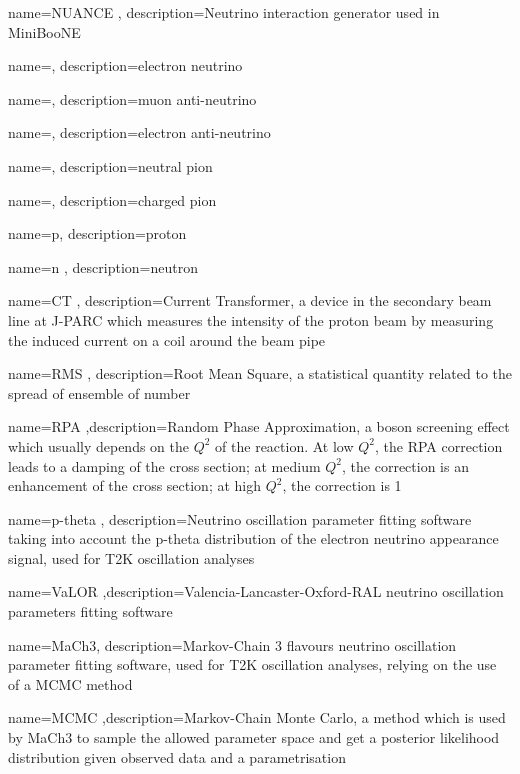  {name=NUANCE , description={Neutrino
interaction generator used in MiniBooNE}}

 {name=\nue , description={electron neutrino}}

 {name=\anumu , description={muon
anti-neutrino}}

 {name=\anue , description={electron
anti-neutrino}}

 {name=\piz , description={neutral pion}}

 {name=\pipm , description={charged pion}}

 {name=p, description={proton}}

 {name=n , description={neutron}}

 {name=CT , description={Current Transformer, a
device in the secondary beam line at J-PARC which measures the
intensity of the proton beam by measuring the induced current on a
coil around the beam pipe}}

 {name=RMS , description={Root Mean Square, a
statistical quantity related to the spread of ensemble of number}}

 {name=RPA ,description={Random Phase
Approximation, a boson screening effect which usually depends on the
$Q^2$ of the reaction. At low $Q^2$, the RPA correction leads to a
damping of the cross section; at medium $Q^2$, the correction is an
enhancement of the cross section; at high $Q^2$, the correction is 1}}

 {name=p-theta , description={Neutrino
oscillation parameter fitting software taking into account the p-theta
distribution of the electron neutrino appearance signal, used for T2K
oscillation analyses}}

 {name=VaLOR
,description={Valencia-Lancaster-Oxford-RAL neutrino oscillation
parameters fitting software}}

 {name=MaCh3, description={Markov-Chain 3
flavours neutrino oscillation parameter fitting software, used for T2K
oscillation analyses, relying on the use of a MCMC method}}

 {name=MCMC ,description={Markov-Chain Monte
Carlo, a method which is used by MaCh3 to sample the allowed parameter
space and get a posterior likelihood distribution given observed data
and a parametrisation}}

